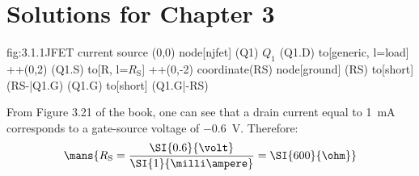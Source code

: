 \chapter{Solutions for Chapter 3}

\begin{circuit}{fig:3.1.1}{JFET current source}
    (0,0) node[njfet] (Q1) {$Q_1$}
    (Q1.D) to[generic, l=load] ++(0,2)
    (Q1.S) to[R, l=$R_\text{S}$] ++(0,-2) coordinate(RS)
    node[ground] {}
    (RS) to[short] (RS-|Q1.G)
    (Q1.G) to[short] (Q1.G|-RS)

\end{circuit}

From Figure 3.21 of the book, one can see that a drain current equal to \SI{1}{\milli\ampere} corresponds to a gate-source voltage of \SI{-0.6}{\volt}.
Therefore:
\[\mans{R_\text{S}=\frac{\SI{0.6}{\volt}}{\SI{1}{\milli\ampere}}=\SI{600}{\ohm}}\]
